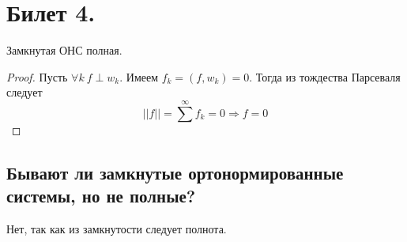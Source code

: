 \section{Билет 4.}

\begin{theorem}
    Замкнутая ОНС полная.
    \begin{proof}
        Пусть $\forall k \> f \perp w_k$. Имеем $f_k  = (f, w_k) = 0$. Тогда из тождества Парсеваля следует
        \[
            ||f|| = \sum^{\infty} f_k = 0 \Rightarrow f = 0
            \]
        \end{proof}
\end{theorem}

\subsection{Бывают ли замкнутые ортонормированные системы, но не полные?}
Нет, так как из замкнутости следует полнота.